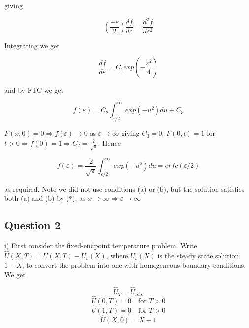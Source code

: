 \documentclass[10pt,a4paper]{report}
\begin{document}
giving

\begin{equation*}
(\frac{-\varepsilon}{2})\frac{df}{d\varepsilon} = \frac{d^2f}{d\varepsilon^2}
\end{equation*}

Integrating we get 

\begin{equation*}
\frac{df}{d\varepsilon} = C_1exp(-\frac{\varepsilon^2}{4})
\end{equation*}

and by FTC we get 

\begin{equation*}
f(\varepsilon) = C_2\int_{\varepsilon/2}^{\infty}exp(-u^2)du + C_3
\end{equation*}

$F(x,0)=0 \Rightarrow f(\varepsilon) \rightarrow 0$ as $\varepsilon \rightarrow \infty$ giving $C_3=0$. $F(0,t)=1$ for $t>0 \Rightarrow f(0)=1 \Rightarrow C_2=\frac{2}{\sqrt{\pi}}$. Hence

\begin{equation*}
f(\varepsilon) = \frac{2}{\sqrt{\pi}} \int_{\varepsilon/2}^{\infty}exp(-u^2)du = erfc(\varepsilon/2)
\end{equation*}

as required. Note we did not use conditions (a) or (b), but the solution satisfies both (a) and (b) by (*), as $x\rightarrow\infty\Rightarrow\varepsilon\rightarrow\infty$


\subsection*{Question 2}

i) First consider the fixed-endpoint temperature problem. Write $\hat{U}(X,T)=U(X,T)-U_s(X)$, where $U_s(X)$ is the steady state solution $1-X$, to convert the problem into one with homogeneous boundary conditions. We get

\begin{equation*}
\hat{U}_T=\hat{U}_{XX} 
\end{equation*}
\begin{equation*}
\hat{U}(0,T)=0 \quad \text{for }T>0
\end{equation*}
\begin{equation*}
\hat{U}(1,T)=0 \quad \text{for }T>0
\end{equation*}
\begin{equation*}
\hat{U}(X,0)=X-1 \tag{**}
\end{equation*}
\end{document}
